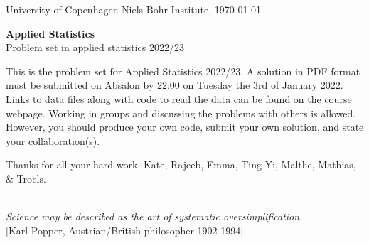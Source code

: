\documentclass[11pt]{article}
\begin{document}

\noindent
University of Copenhagen \hfill
Niels Bohr Institute, \today \par
\vspace{-2ex}
\noindent
\hrulefill

\vspace{1ex}
\begin{center}
{\bf {\Huge Applied Statistics}}\\
\vspace{1ex}
{\large Problem set in applied statistics 2022/23}
\end{center}

\vspace{0ex}
\noindent
This is the problem set for Applied Statistics 2022/23. A solution in PDF format must be submitted on Absalon by 22:00 on Tuesday the 3rd of January 2022. Links to data files along with code to read the data can be found on the course webpage. Working in groups and discussing the problems with others is allowed. However, you should produce your own code, submit your own solution, and state your collaboration(s).

\vspace{-1ex}
\begin{center}
  Thanks for all your hard work, Kate, Rajeeb, Emma, Ting-Yi, Malthe, Mathias, \& Troels.
\end{center}


\noindent
\hrulefill\\
\emph{Science may be described as the art of systematic oversimplification.}\\
  \phantom{foobar} \hfill [Karl Popper, Austrian/British philosopher 1902-1994]\\[-2ex]

\vspace{-2ex}
\noindent
\hrulefill
\end{document}
